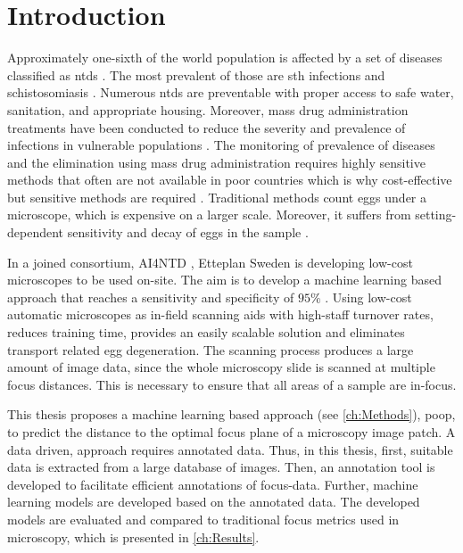 \chapter{Introduction}
\label{ch:Introduction}

Approximately one-sixth of the world population is affected by a set of diseases classified as \acfp{ntd} \cite{feasey2010neglected}. The most prevalent of those are \acf{sth} infections and schistosomiasis \cite{barenbold2017estimating}. Numerous \acp{ntd} are preventable with proper access to safe water, sanitation, and appropriate housing. Moreover, mass drug administration treatments have been conducted to reduce the severity and prevalence of infections in vulnerable populations \cite{jourdan2018soiltransmitted}. The monitoring of prevalence of diseases and the elimination using mass drug administration requires highly sensitive methods that often are not available in poor countries which is why cost-effective but sensitive methods are required \cite{mbongngwese2020diagnostic}.
Traditional methods count eggs under a microscope, which is expensive on a larger scale. Moreover, it suffers from setting-dependent sensitivity and decay of eggs in the sample \cite{barenbold2017estimating}. 

In a joined consortium, AI4NTD \cite{ai4ntd2021developing}, Etteplan Sweden \cite{etteplanoyjengineering} is developing low-cost microscopes to be used on-site. The aim is to develop a machine learning based approach that reaches a sensitivity and specificity of $95 \%$ 
\cite{etteplan2021fighting}. Using low-cost automatic microscopes as in-field scanning aids with high-staff turnover rates, reduces training time, provides an easily scalable solution and eliminates transport related egg degeneration.
The scanning process produces a large amount of image data, since the whole microscopy slide is scanned at multiple focus distances. This is necessary to ensure that all areas of a sample are in-focus.

This thesis proposes a machine learning based approach (see \autoref{ch:Methods}), \ac{poop}, to predict the distance to the optimal focus plane of a microscopy image patch. A data driven, approach requires annotated data. Thus, in this thesis, first, suitable data is extracted from a large database of images. Then, an annotation tool is developed to facilitate efficient annotations of focus-data. Further, machine learning models are developed based on the annotated data. The developed models are evaluated and compared to traditional focus metrics used in microscopy, which is presented in \autoref{ch:Results}.

